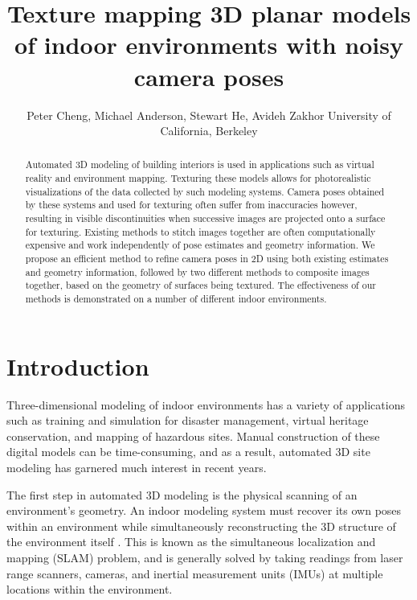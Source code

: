 \documentclass[]{spie}  %
\title{Texture mapping 3D planar models of indoor environments with noisy camera poses}
\author{Peter Cheng, Michael Anderson, Stewart He, Avideh Zakhor
\skiplinehalf
University of California, Berkeley\\
}
\begin{document}
\maketitle

\begin{abstract}
  Automated 3D modeling of building interiors is used in applications
  such as virtual reality and environment mapping. Texturing these
  models allows for photorealistic visualizations of the data
  collected by such modeling systems. Camera poses obtained by these
  systems and used for texturing often suffer from inaccuracies
  however, resulting in visible discontinuities when successive images
  are projected onto a surface for texturing. Existing methods to
  stitch images together are often computationally expensive and work
  independently of pose estimates and geometry information. We propose
  an efficient method to refine camera poses in 2D using both existing
  estimates and geometry information, followed by two different
  methods to composite images together, based on the geometry of
  surfaces being textured. The effectiveness of our methods is
  demonstrated on a number of different indoor environments.
\end{abstract}



\section{Introduction}
\label{sec:introduction} %

Three-dimensional modeling of indoor environments has a variety of
applications such as training and simulation for disaster management,
virtual heritage conservation, and mapping of hazardous sites. Manual
construction of these digital models can be time-consuming, and as a
result, automated 3D site modeling has garnered much interest in
recent years.

The first step in automated 3D modeling is the physical scanning of an
environment's geometry. An indoor modeling system must recover its own
poses within an environment while simultaneously reconstructing the 3D
structure of the environment itself \cite{chen2010indoor,
  liu2010indoor, kua2012loopclosure}. This is known as the
simultaneous localization and mapping (SLAM) problem, and is generally
solved by taking readings from laser range scanners, cameras, and
inertial measurement units (IMUs) at multiple locations within the
environment.
\end{document}
